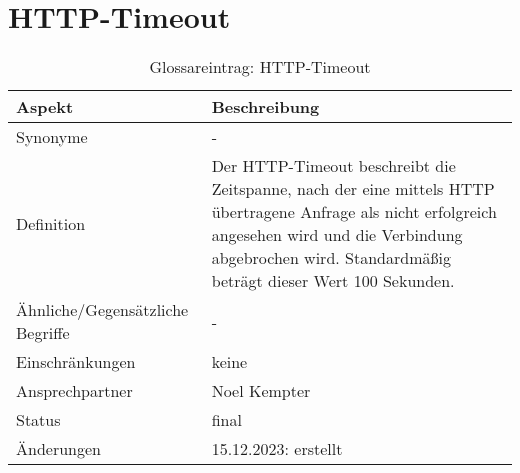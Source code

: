 \section*{HTTP-Timeout}\label{sec:glossar_http_timeout}
\begin{table}[H]
    \label{tab:glossar_http_timeout}
    \begin{tabularx}{\textwidth}{|l|X|}
        \hline
        \textbf{Aspekt}                  & \textbf{Beschreibung} \\
        \hline
        Synonyme                         & -                     \\
        \hline
        Definition & Der HTTP-Timeout beschreibt die Zeitspanne, nach der eine mittels HTTP übertragene Anfrage als nicht erfolgreich angesehen wird und die Verbindung abgebrochen wird.
        Standardmäßig beträgt dieser Wert 100 Sekunden. \\
        \hline
        Ähnliche/Gegensätzliche Begriffe & -                     \\
        \hline
        Einschränkungen                  & keine                 \\
        \hline
        Ansprechpartner                  & Noel Kempter          \\
        \hline
        Status                           & final                 \\
        \hline
        Änderungen                       & 15.12.2023: erstellt  \\
        \hline
    \end{tabularx}
    \caption{Glossareintrag: HTTP-Timeout}
\end{table}

